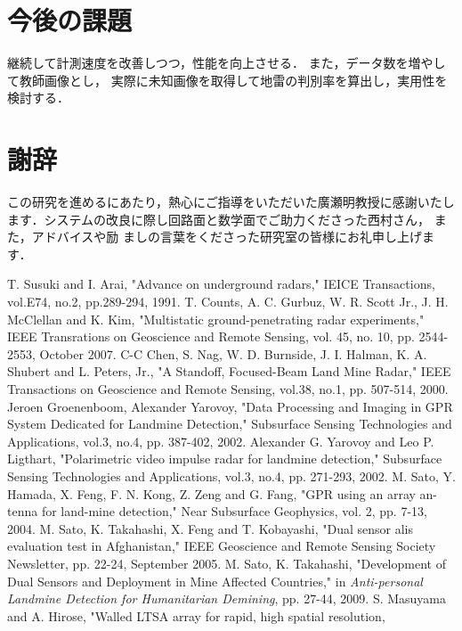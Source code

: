 ﻿\documentclass[12pt,oneside]{jsbook}
\begin{document}
\section{今後の課題}
継続して計測速度を改善しつつ，性能を向上させる．
また，データ数を増やして教師画像とし，
実際に未知画像を取得して地雷の判別率を算出し，実用性を検討する．
\section*{謝辞}
この研究を進めるにあたり，熱心にご指導をいただいた廣瀬明教授に感謝いたし
ます．システムの改良に際し回路面と数学面でご助力くださった西村さん，
また，アドバイスや励
ましの言葉をくださった研究室の皆様にお礼申し上げます．

%
\begin{thebibliography}{99}%
 T. Susuki and I. Arai, "Advance on underground radars," IEICE
Transactions, vol.E74, no.2, pp.289-294, 1991.
 T. Counts, A. C. Gurbuz, W. R. Scott Jr.,
        J. H. McClellan and K. Kim, "Multistatic
ground-penetrating radar experiments," IEEE Transrations on Geoscience and
Remote Sensing, vol. 45, no. 10, pp. 2544-2553, October 2007.
 C-C Chen, S. Nag, W. D. Burnside, J. I. Halman,
K. A. Shubert and L. Peters, Jr., "A Standoff, Focused-Beam Land Mine Radar,"
IEEE Transactions on Geoscience and Remote Sensing, vol.38, no.1, pp. 507-514, 2000.
 Jeroen Groenenboom, Alexander Yarovoy,
"Data Processing and Imaging in GPR System Dedicated for Landmine
Detection," Subsurface Sensing Technologies and Applications, vol.3,
        no.4, pp. 387-402, 2002.
 Alexander G. Yarovoy and  Leo P. Ligthart,
"Polarimetric video impulse radar for landmine detection,"
Subsurface Sensing Technologies and Applications, vol.3, no.4, pp. 271-293, 2002.
 M. Sato, Y. Hamada, X. Feng, F. N. Kong, Z. Zeng and
        G. Fang, "GPR using an array an-
tenna for land-mine detection," Near Subsurface Geophysics, vol. 2,
        pp. 7-13, 2004.
  M. Sato, K. Takahashi, X. Feng and
        T. Kobayashi, "Dual sensor alis evaluation test in
        Afghanistan," IEEE Geoscience and Remote Sensing Society
        Newsletter, pp. 22-24, September 2005.
  M. Sato, K. Takahashi, "Development of
        Dual Sensors and Deployment in Mine Affected
        Countries," in {\it Anti-personal Landmine Detection for
        Humanitarian Demining}, pp. 27-44, 2009.
 S. Masuyama and A. Hirose, "Walled LTSA array for rapid, high spatial resolution,

\end{thebibliography}
\end{document}
